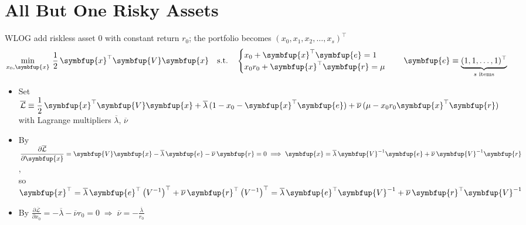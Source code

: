\documentclass[11pt]{extarticle}
\newcommand{\ds}{\displaystyle}
\newcommand{\ie}{\;\Longrightarrow\;}
\newcommand{\vx}{\symbfup{x}}
\newcommand{\vV}{\symbfup{V}}
\newcommand{\ve}{\symbfup{e}}
\newcommand{\vr}{\symbfup{r}}
\theoremstyle{definition}
\begin{document}
\section*{All But One Risky Assets}

\noindent WLOG add riskless asset $0$ with constant return $r_0$; the portfolio becomes $(x_0, x_1, x_2, \ldots, x_s)^\top$ \\
\begin{align*}
  \min_{x_0, \vx}\,\frac{1}{2}\,\vx^\top\vV\vx\quad\text{s.t.}\quad\begin{cases} x_0 + \vx^\top\ve = 1 \\ x_0 r_0 + \vx^\top\vr = \mu\end{cases}\quad\ve\equiv\underbrace{(1, 1, \ldots, 1)^\top}_{\text{$s$ items}}
\end{align*}

\begin{itemize}\setlength\itemsep{0em}
  \item Set $\ds\overline{\mathcal{L}}\equiv\frac{1}{2}\,\vx^\top\vV\vx + \overline{\lambda}\,(1 - x_0 - \vx^\top\ve) + \overline{\nu}\,(\mu - x_0 r_0 \vx^\top\vr)$ with Lagrange multipliers $\overline{\lambda}$, $\overline{\nu}$
  \item By $\ds\frac{\partial\overline{\mathcal{L}}}{\partial\vx} = \vV\vx - \overline{\lambda}\,\ve - \overline{\nu}\,\vr = 0\ie\vx = \overline{\lambda}\,\vV^{-1}\ve + \overline{\nu}\,\vV^{-1}\vr$, \\ so $\ds\vx^\top = \overline{\lambda}\,\ve^\top\left(V^{-1}\right)^\top + \overline{\nu}\,\vr^\top\left(V^{-1}\right)^\top = \overline{\lambda}\,\ve^\top\vV^{-1} + \overline{\nu}\,\vr^\top\vV^{-1}$
  \item By $\ds\frac{\partial\overline{\mathcal{L}}}{\partial x_0} = -\overline{\lambda} - \overline{\nu}r_0 = 0\ie\overline{\nu} = -\frac{\overline{\lambda}}{r_0}$
\end{itemize}

\newpage
\end{document}
